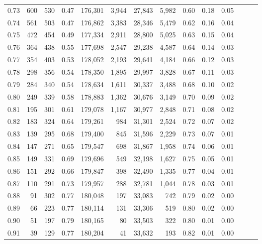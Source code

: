 \begin{tabular}{rrrrrrrrrrrrrr}
0.73 &    600 &  530 &  0.47 &  176,301 &    3,944 &  27,843 &   5,982 &  0.60 &  0.18 &      0.05 \\
0.74 &    561 &  503 &  0.47 &  176,862 &    3,383 &  28,346 &   5,479 &  0.62 &  0.16 &      0.04 \\
0.75 &    472 &  454 &  0.49 &  177,334 &    2,911 &  28,800 &   5,025 &  0.63 &  0.15 &      0.04 \\
0.76 &    364 &  438 &  0.55 &  177,698 &    2,547 &  29,238 &   4,587 &  0.64 &  0.14 &      0.03 \\
0.77 &    354 &  403 &  0.53 &  178,052 &    2,193 &  29,641 &   4,184 &  0.66 &  0.12 &      0.03 \\
0.78 &    298 &  356 &  0.54 &  178,350 &    1,895 &  29,997 &   3,828 &  0.67 &  0.11 &      0.03 \\
0.79 &    284 &  340 &  0.54 &  178,634 &    1,611 &  30,337 &   3,488 &  0.68 &  0.10 &      0.02 \\
0.80 &    249 &  339 &  0.58 &  178,883 &    1,362 &  30,676 &   3,149 &  0.70 &  0.09 &      0.02 \\
0.81 &    195 &  301 &  0.61 &  179,078 &    1,167 &  30,977 &   2,848 &  0.71 &  0.08 &      0.02 \\
0.82 &    183 &  324 &  0.64 &  179,261 &      984 &  31,301 &   2,524 &  0.72 &  0.07 &      0.02 \\
0.83 &    139 &  295 &  0.68 &  179,400 &      845 &  31,596 &   2,229 &  0.73 &  0.07 &      0.01 \\
0.84 &    147 &  271 &  0.65 &  179,547 &      698 &  31,867 &   1,958 &  0.74 &  0.06 &      0.01 \\
0.85 &    149 &  331 &  0.69 &  179,696 &      549 &  32,198 &   1,627 &  0.75 &  0.05 &      0.01 \\
0.86 &    151 &  292 &  0.66 &  179,847 &      398 &  32,490 &   1,335 &  0.77 &  0.04 &      0.01 \\
0.87 &    110 &  291 &  0.73 &  179,957 &      288 &  32,781 &   1,044 &  0.78 &  0.03 &      0.01 \\
0.88 &     91 &  302 &  0.77 &  180,048 &      197 &  33,083 &     742 &  0.79 &  0.02 &      0.00 \\
0.89 &     66 &  223 &  0.77 &  180,114 &      131 &  33,306 &     519 &  0.80 &  0.02 &      0.00 \\
0.90 &     51 &  197 &  0.79 &  180,165 &       80 &  33,503 &     322 &  0.80 &  0.01 &      0.00 \\
0.91 &     39 &  129 &  0.77 &  180,204 &       41 &  33,632 &     193 &  0.82 &  0.01 &      0.00 \\

\end{tabular}
